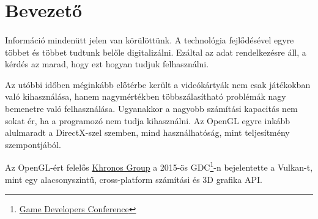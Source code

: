 
\section{Bevezet\H o}
\paragraph{} 
Inform\'aci\'o minden\"utt jelen van k\"or\"ul\"ott\"unk. A technol\'ogia fejl\H od\'es\'evel egyre t\"obbet \'es t\"obbet tudtunk bel\H ole digitaliz\'alni. Ez\'altal az adat rendelkez\'esre \'all, a k\'erd\'es az marad, hogy ezt hogyan tudjuk felhaszn\'alni.

Az ut\'obbi id\H oben m\'egink\'abb el\H ot\'erbe ker\"ult a vide\'ok\'arty\'ak nem csak j\'at\'ekokban val\'o kihaszn\'al\'asa, hanem nagym\'ert\'ekben t\"obbsz\'alas\'ithat\'o probl\'em\'ak nagy bemenetre val\'o felhaszn\'al\'asa. 
Ugyanakkor a nagyobb sz\'am\'it\'asi kapacit\'as nem sokat \'er, ha a programoz\'o nem tudja kihaszn\'alni. Az OpenGL egyre ink\'abb alulmaradt a DirectX-szel szemben, mind haszn\'alhat\'os\'ag, mint teljes\'itm\'eny szempontj\'ab\'ol.

Az OpenGL-\'ert felel\H os \href{https://www.khronos.org/}{Khronos Group} a 2015-\"os GDC\footnote{\href{http://www.gdconf.com/}{Game Developers Conference}}-n bejelentette a Vulkan-t, mint egy alacsonyszint\H u, cross-platform sz\'am\'it\'asi \'es 3D grafika API.
